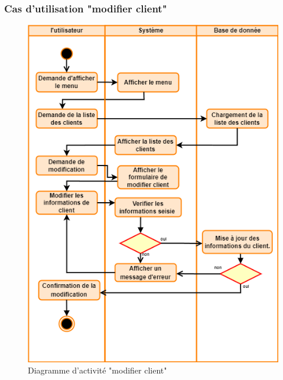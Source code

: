 \documentclass[edit,12pt,a4paper,ChapStyle,oneside,doubleinterligne]{report}
\begin{document}
\subsubsection{Cas d'utilisation "modifier client"}
\begin{figure}[h!]\label{fig:activite modiciferc}
    \centering
    \includegraphics[width=1\textwidth]{images/act modifier client.png}
    \caption{Diagramme d'activité "modifier client"}
\end{figure}

\clearpage
\end{document}
